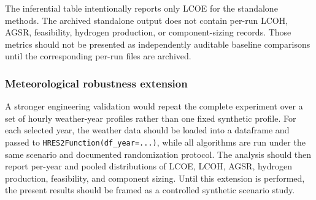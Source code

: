 The inferential table intentionally reports only LCOE for the standalone
methods. The archived standalone output does not contain per-run LCOH, AGSR,
feasibility, hydrogen production, or component-sizing records. Those metrics
should not be presented as independently auditable baseline comparisons until
the corresponding per-run files are archived.

\subsubsection{Meteorological robustness extension}

A stronger engineering validation would repeat the complete experiment over a
set of hourly weather-year profiles rather than one fixed synthetic profile.
For each selected year, the weather data should be loaded into a dataframe and
passed to \texttt{HRES2Function(df\_year=...)}, while all algorithms are run
under the same scenario and documented randomization protocol. The analysis
should then report per-year and pooled distributions of LCOE, LCOH, AGSR,
hydrogen production, feasibility, and component sizing. Until this extension
is performed, the present results should be framed as a controlled synthetic
scenario study.

